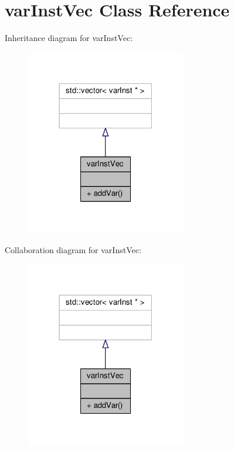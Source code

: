 \hypertarget{classvarInstVec}{}\section{var\+Inst\+Vec Class Reference}
\label{classvarInstVec}


Inheritance diagram for var\+Inst\+Vec\+:
\nopagebreak
\begin{figure}[H]
\begin{center}
\leavevmode
\includegraphics[width=198pt]{dc/d54/classvarInstVec__inherit__graph}
\end{center}
\end{figure}


Collaboration diagram for var\+Inst\+Vec\+:
\nopagebreak
\begin{figure}[H]
\begin{center}
\leavevmode
\includegraphics[width=198pt]{d2/d14/classvarInstVec__coll__graph}
\end{center}
\end{figure}
